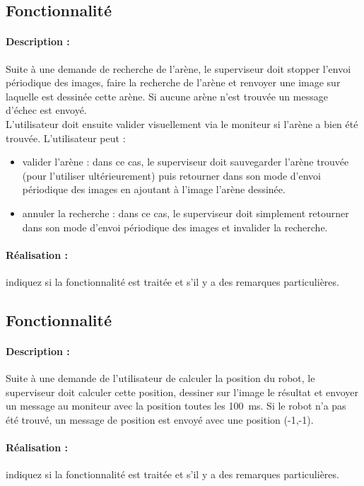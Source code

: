 \documentclass[11pt, a4paper]{paper}
\newcounter{cptreq}
\begin{document}
\subsection{Fonctionnalité \thecptreq}

\paragraph{Description :} Suite à une demande de recherche de l'arène, le superviseur doit stopper l'envoi périodique des images, faire la recherche de l'arène et renvoyer une image sur laquelle est dessinée cette arène. Si aucune arène n'est trouvée un message d'échec est envoyé.\\

L'utilisateur doit ensuite valider visuellement via le moniteur si l'arène a bien été trouvée. L'utilisateur peut :
\begin{itemize}
	\item valider l'arène : dans ce cas, le superviseur doit sauvegarder l'arène trouvée (pour l'utiliser ultérieurement) puis retourner dans son mode d'envoi périodique des images en ajoutant à l'image l'arène dessinée.
 	\item annuler la recherche : dans ce cas, le superviseur doit simplement retourner dans son mode d'envoi périodique des images et invalider la recherche.
\end{itemize}

\paragraph{\color{black}Réalisation :}  {\color{red} indiquez si la fonctionnalité est traitée et s'il y a des remarques particulières.}
\subsection{Fonctionnalité \thecptreq}

\paragraph{Description :} Suite à une demande de l'utilisateur de calculer la position du robot, le superviseur doit calculer cette position, dessiner sur l'image le résultat et envoyer un message au moniteur avec la position toutes les 100~ms. Si le robot n'a pas été trouvé, un message de position est envoyé avec une position (-1,-1).

\paragraph{\color{black}Réalisation :}  {\color{red} indiquez si la fonctionnalité est traitée et s'il y a des remarques particulières.}
\end{document}
